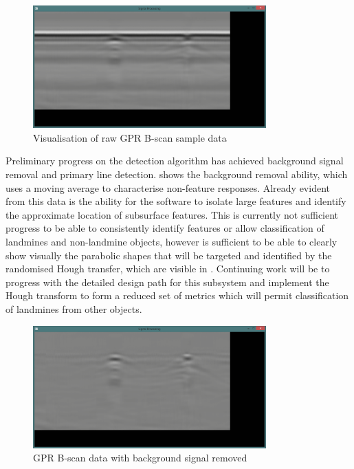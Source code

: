 \documentclass[main.tex]{subfiles}
\begin{document}
\begin{figure}[ht]
\includegraphics[width=0.8\textwidth]{7-Conclusion/raw.png}
\centering
\caption{Visualisation of raw GPR B-scan sample data}
\end{figure}
Preliminary progress on the detection algorithm has achieved background signal removal and primary line detection.  shows the background removal ability, which uses a moving average to characterise non-feature responses. Already evident from this data is the ability for the software to isolate large features and identify the approximate location of subsurface features. This is currently not sufficient progress to be able to consistently identify features or allow classification of landmines and non-landmine objects, however is sufficient to be able to clearly show visually the parabolic shapes that will be targeted and identified by the randomised Hough transfer, which are visible in . Continuing work will be to progress with the detailed design path for this subsystem and implement the Hough transform to form a reduced set of metrics which will permit classification of landmines from other objects.

\begin{figure}[ht]
\includegraphics[width=0.8\textwidth]{7-Conclusion/bg-removed.png}
\centering
\caption{GPR B-scan data with background signal removed}
\end{figure}
\end{document}
